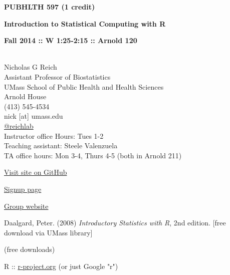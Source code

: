 \documentclass[10pt]{article}
\begin{document}
\centerline{\bf \large 
PUBHLTH 597 (1 credit)} 
\centerline{\bf \large Introduction to Statistical Computing with R}
\centerline{\bf Fall 2014 :: W 1:25-2:15  :: Arnold 120 }

\vspace{.25in}
\\
\noindent Nicholas G Reich \\
\noindent Assistant Professor of Biostatistics \\
\noindent UMass School of Public Health and Health Sciences \\
 Arnold House \\
\noindent (413) 545-4534 \\
\noindent nick [at] umass.edu \\
\noindent \href{https://twitter.com/reichlab}{@reichlab}\\


\noindent Instructor office Hours: Tues 1-2 \\
\noindent Teaching assistant: Steele Valenzuela\\
\noindent TA office hours: Mon 3-4, Thurs 4-5 (both in Arnold 211)





\bigskip
{}


\href{https://github.com/nickreich/statComp2014}{Visit site on GitHub}


\href{http://piazza.com/umass/fall2014/pubhlth597}{Signup page}

\href{http://piazza.com/umass/fall2014/pubhlth597/home}{Group website}



Daalgard, Peter. (2008) {\em Introductory Statistics with R}, 2nd edition. [free download via UMass library]  



 (free downloads)

R :: \href{http://www.r-project.org}{r-project.org} (or just Google "r")
\end{document}
